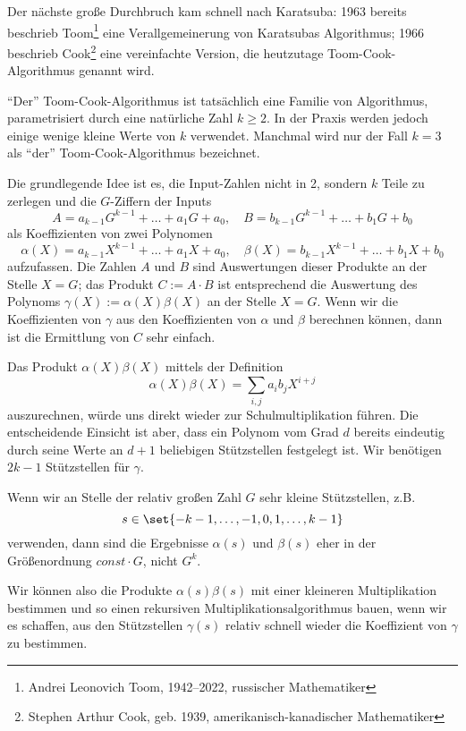 
\begin{remark}
    Der nächste große Durchbruch kam schnell nach Karatsuba: 1963 bereits beschrieb Toom\footnote{Andrei Leonovich Toom, 1942--2022, russischer Mathematiker} eine Verallgemeinerung von Karatsubas Algorithmus; 1966 beschrieb Cook\footnote{Stephen Arthur Cook, geb. 1939, amerikanisch-kanadischer Mathematiker} eine vereinfachte Version, die heutzutage Toom-Cook-Algorithmus genannt wird.

    \medskip
    \enquote{Der} Toom-Cook-Algorithmus ist tatsächlich eine Familie von Algorithmus, parametrisiert durch eine natürliche Zahl $k\geq 2$. In der Praxis werden jedoch einige wenige kleine Werte von $k$ verwendet. Manchmal wird nur der Fall $k=3$ als \enquote{der} Toom-Cook-Algorithmus bezeichnet.

    \smallskip
    Die grundlegende Idee ist es, die Input-Zahlen nicht in 2, sondern $k$ Teile zu zerlegen und die $G$-Ziffern der Inputs
    \[A = a_{k-1} G^{k-1} + \ldots + a_1 G + a_0, \quad B = b_{k-1} G^{k-1} + \ldots + b_1 G + b_0\]
    als Koeffizienten von zwei Polynomen
    \[\alpha(X) = a_{k-1} X^{k-1} + \ldots + a_1 X + a_0, \quad \beta(X) = b_{k-1} X^{k-1} + \ldots + b_1 X + b_0\]
    aufzufassen. Die Zahlen $A$ und $B$ sind Auswertungen dieser Produkte an der Stelle $X=G$; das Produkt $C:=A\cdot B$ ist entsprechend die Auswertung des Polynoms $\gamma(X):=\alpha(X)\beta(X)$ an der Stelle $X=G$. Wenn wir die Koeffizienten von $\gamma$ aus den Koeffizienten von $\alpha$ und $\beta$ berechnen können, dann ist die Ermittlung von $C$ sehr einfach.

    \smallskip
    Das Produkt $\alpha(X)\beta(X)$ mittels der Definition
    \[\alpha(X)\beta(X) = \sum_{i,j} a_i b_j X^{i+j}\]
    auszurechnen, würde uns direkt wieder zur Schulmultiplikation führen. Die entscheidende Einsicht ist aber, dass ein Polynom vom Grad $d$ bereits eindeutig durch seine Werte an $d+1$ beliebigen Stützstellen festgelegt ist. Wir benötigen $2k-1$ Stützstellen für $\gamma$.

    Wenn wir an Stelle der relativ großen Zahl $G$ sehr kleine Stützstellen, z.B.
    \[s\in\set{-k-1,\ldots,-1,0,1,\ldots,k-1}\]
    verwenden, dann sind die Ergebnisse $\alpha(s)$ und $\beta(s)$ eher in der Größenordnung $const\cdot G$, nicht $G^k$.

    Wir können also die Produkte $\alpha(s)\beta(s)$ mit einer kleineren Multiplikation bestimmen und so einen rekursiven Multiplikationsalgorithmus bauen, wenn wir es schaffen, aus den Stützstellen $\gamma(s)$ relativ schnell wieder die Koeffizient von $\gamma$ zu bestimmen.
\end{remark}

